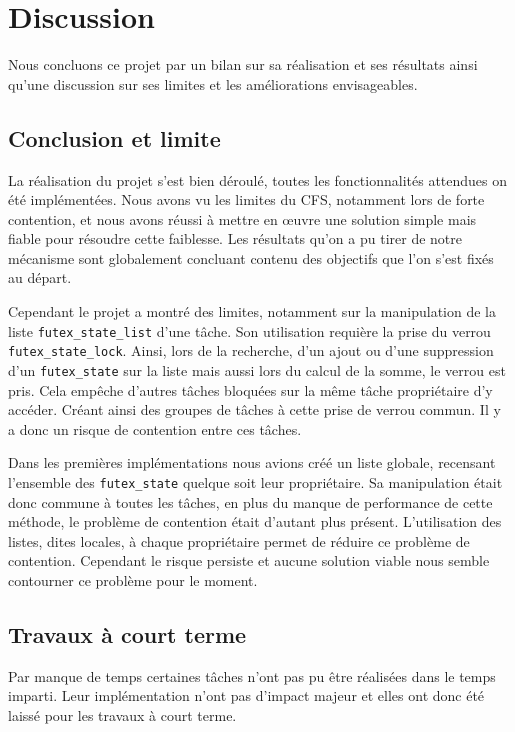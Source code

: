 \section{Discussion}

Nous concluons ce projet par un bilan sur sa réalisation et ses résultats ainsi qu'une discussion sur 
ses limites et les améliorations envisageables.

\subsection{Conclusion et limite}

La réalisation du projet s'est bien déroulé, toutes les fonctionnalités attendues on été
implémentées. Nous avons vu les limites du CFS, notamment lors de forte contention, et nous avons réussi à mettre en 
œuvre une solution simple mais fiable pour résoudre cette faiblesse. Les résultats qu'on a pu tirer de notre mécanisme sont globalement concluant contenu des objectifs que l'on s'est fixés au départ.

Cependant le projet a montré des limites, notamment sur la manipulation de la liste \verb|futex_state_list| d'une tâche.
Son utilisation requière la prise du verrou \verb|futex_state_lock|.
Ainsi, lors de la recherche, d'un ajout ou d'une suppression d'un \verb|futex_state|
sur la liste mais aussi lors du calcul de la somme, le verrou est pris. Cela empêche d'autres tâches bloquées
sur la même tâche propriétaire d'y accéder. Créant ainsi des groupes de tâches à cette prise de
verrou commun. Il y a donc un risque de contention entre ces tâches.

Dans les premières implémentations nous avions créé un liste globale, recensant l'ensemble des \verb|futex_state| quelque soit
leur propriétaire. Sa manipulation était donc commune à toutes les tâches, en plus du manque de performance de 
cette méthode, le problème de contention était d'autant plus présent. L'utilisation des listes, dites locales, à chaque
propriétaire permet de réduire ce problème de contention. Cependant le risque persiste et aucune solution 
viable nous semble contourner ce problème pour le moment.

\subsection{Travaux à court terme}
Par manque de temps certaines tâches n'ont pas pu être réalisées dans le temps imparti.
Leur implémentation n'ont pas d'impact majeur et elles ont donc été laissé pour les travaux à court terme.

